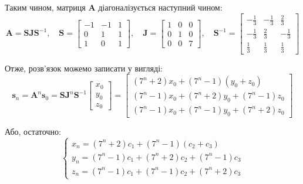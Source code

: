 \documentclass{hw_template}
\begin{document}
Таким чином, матриця $\boldsymbol{A}$ діагоналізується наступний чином:
\begin{equation*}
    \boldsymbol{A} = \boldsymbol{S}\boldsymbol{J}\boldsymbol{S}^{-1}, \quad \boldsymbol{S} = \begin{bmatrix}
        -1 & -1 & 1 \\
        0 & 1 & 1 \\
        1 & 0 & 1
    \end{bmatrix}, \quad \boldsymbol{J} = \begin{bmatrix}
        1 & 0 & 0 \\
        0 & 1 & 0 \\
        0 & 0 & 7
    \end{bmatrix}, \quad \boldsymbol{S}^{-1} = \begin{bmatrix}
        -\frac{1}{3} & -\frac{1}{3} & \frac{2}{3} \\
        -\frac{1}{3} & \frac{2}{3} & -\frac{1}{3} \\
        \frac{1}{3} & \frac{1}{3} & \frac{1}{3}
    \end{bmatrix}
\end{equation*}

Отже, розв'язок можемо записати у вигляді:
\begin{equation*}
    \boldsymbol{s}_n = \boldsymbol{A}^n\boldsymbol{s}_0 = \boldsymbol{S}\boldsymbol{J}^n\boldsymbol{S}^{-1}\begin{bmatrix}
        x_0 \\ y_0 \\ z_0
    \end{bmatrix} = \begin{bmatrix}
        (7^n+2)x_0 + (7^n-1)(y_0+z_0) \\
        (7^n-1)x_0 + (7^n+2)y_0 + (7^n-1)z_0 \\
        (7^n-1)x_0 + (7^n-1)y_0 + (7^n+2)z_0
    \end{bmatrix}
\end{equation*}

Або, остаточно:
\begin{equation*}
    \begin{cases}
        x_n = (7^n+2)c_1 + (7^n-1)(c_2+c_3) \\
        y_n = (7^n-1)c_1 + (7^n+2)c_2 + (7^n-1)c_3 \\
        z_n = (7^n-1)c_1 + (7^n-1)c_2 + (7^n+2)c_3
    \end{cases}
\end{equation*}
\end{document}
